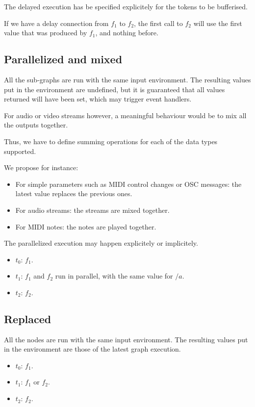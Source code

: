 \documentclass{article}
\begin{document}
    The delayed execution has be specified explicitely for the tokens to be bufferised.
    
    If we have a delay connection from $f_1$ to $f_2$, the first call to $f_2$ will use the first value that was produced by $f_1$, and nothing before.
	
	\subsection{Parallelized and mixed}
	All the sub-graphs are run with the same input environment. 
	The resulting values put in the environment are undefined, but it is guaranteed that all values returned will have been set, which may trigger event handlers.
    
    For audio or video streams however, a meaningful behaviour would be to mix all the outputs together.
    
    Thus, we have to define summing operations for each of the data types supported.
    
    We propose for instance: 
    \begin{itemize}
        \item For simple parameters such as MIDI control changes or OSC messages: the latest value replaces the previous ones.
        \item For audio streams: the streams are mixed together.
        \item For MIDI notes: the notes are played together.
    \end{itemize}

    The parallelized execution may happen explicitely or implicitely.

    \begin{itemize}
        \item $t_0$: $f_1$.
        \item $t_1$: $f_1$ and $f_2$ run in parallel, with the same value for $/a$.
        \item $t_2$: $f_2$. 
    \end{itemize}
     
	\subsection{Replaced}
	All the nodes are run with the same input environment. 
	The resulting values put in the environment are those of the latest graph execution.
	 
    \begin{itemize}
        \item $t_0$: $f_1$.
        \item $t_1$: $f_1$ or $f_2$.
        \item $t_2$: $f_2$. 
    \end{itemize}
\end{document}
